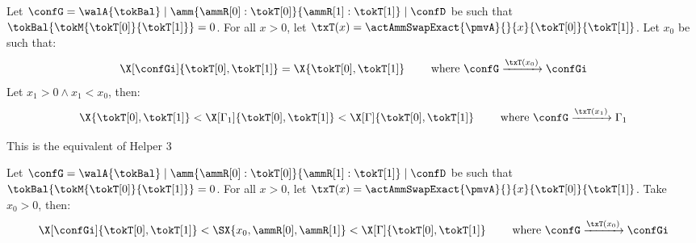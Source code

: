 \begin{thm}[Helper 2]
  \label{thm:helper2}  
  Let $\confG = \walA{\tokBal} \mid \amm{\ammR[0]:\tokT[0]}{\ammR[1]:\tokT[1]} \mid \confD$ 
  be such that $\tokBal{\tokM{\tokT[0]}{\tokT[1]}} = 0$.
  For all $x > 0$, 
  let $\txT(x) = \actAmmSwapExact{\pmvA}{}{x}{\tokT[0]}{\tokT[1]}$.
  Let $x_0$ be such that:
  \begin{equation}
    \label{eq:arbitrage:max:x0}
    \X[\confGi]{\tokT[0],\tokT[1]} = \X{\tokT[0],\tokT[1]}
    \qquad
    \text{ where }
    \confG \xrightarrow{\txT(x_0)} \confGi
  \end{equation}
  Let $x_1 > 0  \land x_1 < x_0$, then: 
  \begin{equation}
    \X{\tokT[0],\tokT[1]} < \X[\Gamma_1]{\tokT[0],\tokT[1]} < \X[\Gamma]{\tokT[0],\tokT[1]}
    \qquad
    \text{ where }
    \confG \xrightarrow{\txT(x_1)} \Gamma_1
  \end{equation}
  
\end{thm}

This is the equivalent of Helper 3
\begin{thm}[Helper 3]
  \label{thm:helper-3}  
  Let $\confG = \walA{\tokBal} \mid \amm{\ammR[0]:\tokT[0]}{\ammR[1]:\tokT[1]} \mid \confD$ 
  be such that $\tokBal{\tokM{\tokT[0]}{\tokT[1]}} = 0$.
  For all $x > 0$, 
  let $\txT(x) = \actAmmSwapExact{\pmvA}{}{x}{\tokT[0]}{\tokT[1]}$.
  Take $x_0 > 0$, then:
  \begin{equation}
    \X[\confGi]{\tokT[0],\tokT[1]} < \SX{x_0, \ammR[0], \ammR[1]} < \X[\Gamma]{\tokT[0],\tokT[1]}
    \qquad
    \text{ where }
    \confG \xrightarrow{\txT(x_0)} \confGi
  \end{equation}
  
\end{thm}

